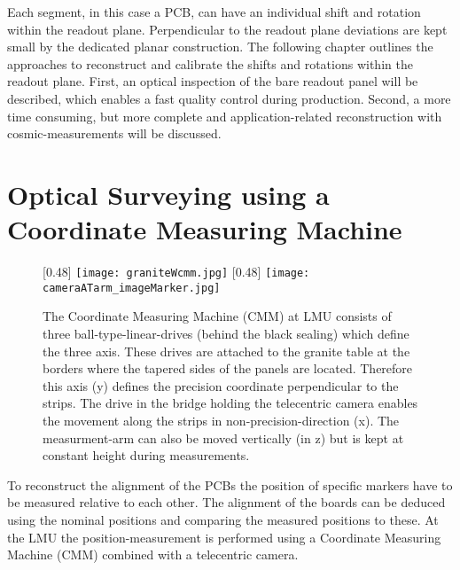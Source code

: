 \documentclass[
twoside,            %
BCOR1.4cm,          %
10pt,               %
headings=normal,    %
headsepline,        %
clearplainpage,		%
final,              %
div=14,
open=right,
bibliography=toc
]{scrreprt}
\begin{document}
Each segment, in this case a PCB, can have an individual shift and rotation within the readout plane.
Perpendicular to the readout plane deviations are kept small by the dedicated planar construction.
The following chapter outlines the approaches to reconstruct and calibrate the shifts and rotations within the readout plane.
First, an optical inspection of the bare readout panel will be described, which enables a fast quality control during production.
Second, a more time consuming, but more complete and application-related reconstruction with cosmic-measurements will be discussed.

\section{Optical Surveying using a Coordinate Measuring Machine}

\begin{figure}[!h]
	\centering
	[0.48\textwidth]
	{\texttt{[image: graniteWcmm.jpg]}}
	\hfill
	[0.48\textwidth]
	{\texttt{[image: cameraATarm\_imageMarker.jpg]}}
	\vspace{-2mm}
	\caption{
		The Coordinate Measuring Machine (CMM) at  LMU consists of three ball-type-linear-drives (behind the black sealing) which define the three axis.
		These drives are attached to the granite table at the borders where the tapered sides of the panels are located.
		Therefore this axis (y) defines the precision coordinate perpendicular to the strips.
		The drive in the bridge holding the telecentric camera enables the movement along the strips in non-precision-direction (x).
		The measurment-arm can also be moved vertically (in z) but is kept at constant height during measurements.
	}
\end{figure}

To reconstruct the alignment of the PCBs the position of specific markers have to be measured relative to each other.
The alignment of the boards can be deduced using the nominal positions and comparing the measured positions to these.
At the LMU the position-measurement is performed using a Coordinate Measuring Machine (CMM) combined with a telecentric camera.
\end{document}
